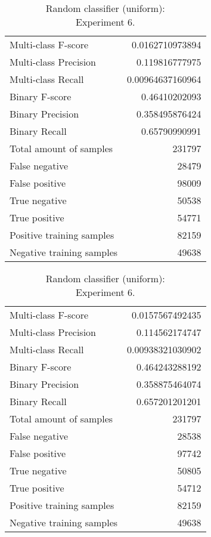 \begin{table}[H]
\begin{minipage}{0.5\textwidth}
\caption{Random classifier (uniform): \\Experiment 5.}
\centering
\begin{tabular}{l r}
\toprule
Multi-class F-score & 0.0162710973894 \\
Multi-class Precision & 0.119816777975 \\
Multi-class Recall & 0.00964637160964 \\
\midrule
Binary F-score & 0.46410202093 \\
Binary Precision & 0.358495876424 \\
Binary Recall & 0.65790990991 \\
\midrule
Total amount of samples & 231797 \\
False negative & 28479 \\
False positive & 98009 \\
True negative & 50538 \\
True positive & 54771 \\
\midrule
Positive training samples & 82159 \\
Negative training samples & 49638 \\
\bottomrule
\end{tabular}
\end{minipage}
\hfillx
\begin{minipage}{0.5\textwidth}
\caption{Random classifier (uniform): \\Experiment 6.}
\centering
\begin{tabular}{l r}
\toprule
Multi-class F-score & 0.0157567492435 \\
Multi-class Precision & 0.114562174747 \\
Multi-class Recall & 0.00938321030902 \\
\midrule
Binary F-score & 0.464243288192 \\
Binary Precision & 0.358875464074 \\
Binary Recall & 0.657201201201 \\
\midrule
Total amount of samples & 231797 \\
False negative & 28538 \\
False positive & 97742 \\
True negative & 50805 \\
True positive & 54712 \\
\midrule
Positive training samples & 82159 \\
Negative training samples & 49638 \\
\bottomrule
\end{tabular}
\end{minipage}
\end{table}
